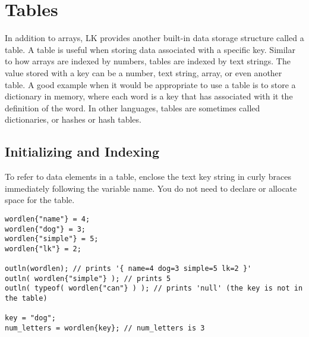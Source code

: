 \documentclass{article}
\begin{document}

\section{Tables}

In addition to arrays, LK provides another built-in data storage structure called a table.  A table is useful when storing data associated with a specific key.  Similar to how arrays are indexed by numbers, tables are indexed by text strings.  The value stored with a key can be a number, text string, array, or even another table.  A good example when it would be appropriate to use a table is to store a dictionary in memory, where each word is a key that has associated with it the definition of the word.  In other languages, tables are sometimes called dictionaries, or hashes or hash tables. 

\subsection{Initializing and Indexing}

To refer to data elements in a table, enclose the text key string in curly braces immediately following the variable name.  You do not need to declare or allocate space for the table.  

\begin{verbatim}
wordlen{"name"} = 4;
wordlen{"dog"} = 3;
wordlen{"simple"} = 5;
wordlen{"lk"} = 2;

outln(wordlen); // prints '{ name=4 dog=3 simple=5 lk=2 }'
outln( wordlen{"simple"} ); // prints 5
outln( typeof( wordlen{"can"} ) ); // prints 'null' (the key is not in the table)

key = "dog";
num_letters = wordlen{key}; // num_letters is 3
\end{verbatim}
\end{document}
